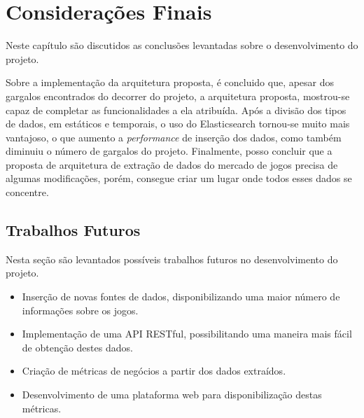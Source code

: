 \chapter[Considerações Finais]{Considerações Finais}
Neste capítulo são discutidos as conclusões levantadas sobre o desenvolvimento do projeto.

Sobre a implementação da arquitetura proposta, é concluido que, apesar dos gargalos encontrados do decorrer do projeto, a arquitetura proposta, mostrou-se capaz de completar as funcionalidades a ela atribuída. Após a divisão dos tipos de dados, em estáticos e temporais, o uso do Elasticsearch tornou-se muito mais vantajoso, o que aumento a \textit{performance} de inserção dos dados, como também diminuiu o número de gargalos do projeto. Finalmente, posso concluir que a proposta de arquitetura de extração de dados do mercado de jogos precisa de algumas modificações, porém, consegue criar um lugar onde todos esses dados se concentre.

\section{Trabalhos Futuros}
Nesta seção são levantados possíveis trabalhos futuros no desenvolvimento do projeto.
\begin{itemize}
	\item Inserção de novas fontes de dados, disponibilizando uma maior número de informações sobre os jogos.
	\item Implementação de uma API RESTful, possibilitando uma maneira mais fácil de obtenção destes dados.
	\item Criação de métricas de negócios a partir dos dados extraídos.
	\item Desenvolvimento de uma plataforma web para disponibilização destas métricas.
\end{itemize}